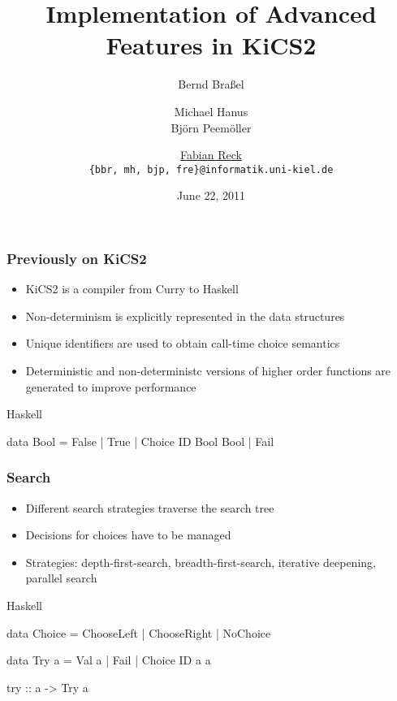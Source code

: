 \documentclass[utf8]{beamer}
\newenvironment{program}{\begin{semiverbatim}\small}{\end{semiverbatim}}
\begin{document}
\title[KiCS2]{Implementation of Advanced Features in KiCS2}

\date{June 22, 2011}

\author[B. Braßel, M. Hanus, B. Peemöller,  \underline{F. Reck}]
 {Bernd Braßel \and Michael Hanus \\
   Björn Peemöller \and \underline{Fabian Reck}\\
  \texttt{\{bbr, mh, bjp, fre\}@informatik.uni-kiel.de}}


\begin{frame}
\titlepage
\end{frame}

\begin{frame}[fragile]
\frametitle{Previously on KiCS2}
\begin{itemize}
\item KiCS2 is a compiler from Curry to Haskell
\item Non-determinism is explicitly represented in
      the data structures
\item Unique identifiers are used to obtain
      call-time choice semantics
\item Deterministic and non-deterministc versions
      of higher order functions are generated to
      improve performance
\end{itemize}

\begin{block}{Haskell}
\begin{program}
data Bool = False | True | Choice ID Bool Bool | Fail
\end{program}
\end{block}
\end{frame}

\begin{frame}[fragile]
\frametitle{Search}

\begin{itemize}
 \item Different search strategies traverse the search tree
 \item Decisions for choices have to be managed
 \item Strategies: depth-first-search, breadth-first-search,
       iterative deepening, parallel search
\end{itemize}

\begin{block}{Haskell}
\begin{program}
data Choice = ChooseLeft
            | ChooseRight
            | NoChoice

data Try a = Val a
           | Fail
           | Choice ID a a

try :: a -> Try a
\end{program}
\end{block}

\end{frame}
\end{document}
